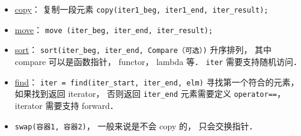 
\begin{issues}
\issueDraft
\end{issues}

\begin{itemize}
\item \href{https://cplusplus.com/reference/algorithm/copy/}{copy}： 复制一段元素 \verb|copy(iter1_beg, iter1_end, iter_result);|
\item \href{https://cplusplus.com/reference/algorithm/move/}{move}： \verb|move (iter_beg, iter_end, iter_result);|
\item \href{https://cplusplus.com/reference/algorithm/sort/}{sort}： \verb|sort(iter_beg, iter_end, Compare（可选）)| 升序排列， 其中 compare 可以是函数指针， functor， lambda 等． \verb|iter| 需要支持随机访问．
\item \href{https://cplusplus.com/reference/algorithm/find/}{find}： \verb|iter = find(iter_start, iter_end, elm)| 寻找第一个符合的元素， 如果找到返回 iterator， 否则返回 \verb|iter_end| 元素需要定义 \verb|operator==|， iterator 需要支持 forward．
\item \verb|swap(容器1, 容器2)|， 一般来说是不会 copy 的， 只会交换指针．
\end{itemize}
